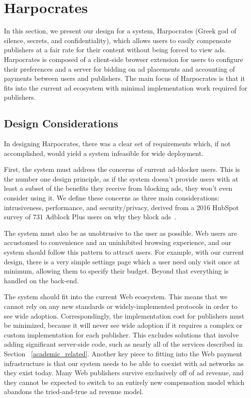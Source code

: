 \section{Harpocrates}
In this section, we present our design for a system, Harpocrates (Greek god of silence, secrets, and confidentiality), which allows users to easily compensate publishers at a fair rate for their content without being forced to view ads.
Harpocrates is composed of a client-side browser extension for users to configure their preferences and a server for bidding on ad placements and accounting of payments between users and publishers.
The main focus of Harpocrates is that it fits into the current ad ecosystem with minimal implementation work required for publishers.

\subsection{Design Considerations}
In designing Harpocrates, there was a clear set of requirements which, if not accomplished, would yield a system infeasible for wide deployment.

First, the system must address the concerns of current ad-blocker users. This is the number one design principle, as if the system doesn't provide users with at least a subset of the benefits they receive from blocking ads, they won't even consider using it. We define these concerns as three main considerations: intrusiveness, performance, and security/privacy, derived from a 2016 HubSpot survey of 731 Adblock Plus users on why they block ads~\cite{hubspot2016adblock}.

The system must also be as unobtrusive to the user as possible.
Web users are accustomed to convenience and an uninhibited browsing experience, and our system should follow this pattern to attract users.
For example, with our current design, there is a very simple settings page which a user need only visit once at minimum, allowing them to specify their budget.
Beyond that everything is handled on the back-end.

The system should fit into the current Web ecosystem.
This means that we cannot rely on any new standards or widely-implemented protocols in order to see wide adoption.
Correspondingly, the implementation cost for publishers must be minimized, because it will never see wide adoption if it requires a complex or custom implementation for each publisher.
This excludes solutions that involve adding significant server-side code, such as nearly all of the services described in Section ~\ref{academic_related}.
Another key piece to fitting into the Web payment infrastructure is that our system needs to be able to coexist with ad networks as they exist today.
Many Web publishers survive exclusively off of ad revenue, and they cannot be expected to switch to an entirely new compensation model which abandons the tried-and-true ad revenue model.

